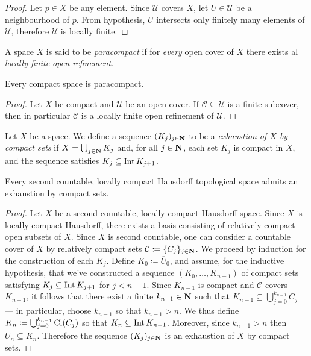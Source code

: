 \begin{proof}
Let \(p \in X\) be any element. Since \(\mathcal{U}\) covers \(X\), let
\(U \in \mathcal{U}\) be a neighbourhood of \(p\). From hypothesis, \(U\)
intersects only finitely many elements of \(\mathcal{U}\), therefore
\(\mathcal{U}\) is locally finite.
\end{proof}

\begin{definition}[Paracompactness]
\label{def:paracompact}
A space \(X\) is said to be \emph{paracompact} if for \emph{every} open cover
of \(X\) there exists al \emph{locally finite open refinement}.
\end{definition}

\begin{corollary}
\label{cor:compact-is-paracompact}
Every compact space is paracompact.
\end{corollary}

\begin{proof}
Let \(X\) be compact and \(\mathcal{U}\) be an open cover. If
\(\mathcal{C} \subseteq \mathcal{U}\) is a finite subcover, then in particular
\(\mathcal{C}\) is a locally finite open refinement of \(\mathcal{U}\).
\end{proof}

\begin{definition}
\label{def:compact-exhaustion}
Let \(X\) be a space. We define a sequence \((K_j)_{j \in \mathbf{N}}\) to be a
\emph{exhaustion of \(X\) by compact sets} if \(X = \bigcup_{j \in \mathbf{N}} K_j\)
and, for all \(j \in \mathbf{N}\), each set \(K_j\) is compact in \(X\), and the
sequence satisfies \(K_j \subseteq \operatorname{Int} K_{j + 1}\).
\end{definition}

\begin{lemma}
\label{lem:2nd-loc-cpct-haus-exhaustion}
Every second countable, locally compact Hausdorff topological space admits an
exhaustion by compact sets.
\end{lemma}

\begin{proof}
Let \(X\) be a second countable, locally compact Hausdorff space. Since \(X\) is
locally compact Hausdorff, there exists a basis consisting of relatively compact
open subsets of \(X\). Since \(X\) is second countable, one can consider a
countable cover of \(X\) by relatively compact sets
\(\mathcal{C} \coloneq \{C_j\}_{j \in \mathbf{N}}\). We proceed by induction for the
construction of each \(K_j\). Define \(K_0 \coloneq \overline{U}_0\), and
assume, for the inductive hypothesis, that we've constructed a sequence
\((K_0, \dots, K_{n-1})\) of compact sets satisfying
\(K_j \subseteq \operatorname{Int} K_{j+1}\) for \(j < n-1\). Since \(K_{n-1}\) is compact and
\(\mathcal{C}\) covers \(K_{n-1}\), it follows that there exist a finite
\(k_{n-1} \in \mathbf{N}\) such that \(K_{n-1} \subseteq \bigcup_{j=0}^{k_{n-1}} C_j\)
--- in particular, choose \(k_{n-1}\) so that \(k_{n-1} > n\). We thus define
\(K_n \coloneq \bigcup_{j=0}^{k_{n-1}} \operatorname{Cl}(C_j)\) so that
\(K_n \subseteq \operatorname{Int} K_{n-1}\). Moreover, since \(k_{n-1} > n\) then
\(U_n \subseteq K_n\). Therefore the sequence \((K_j)_{j \in \mathbf{N}}\) is an
exhaustion of \(X\) by compact sets.
\end{proof}

